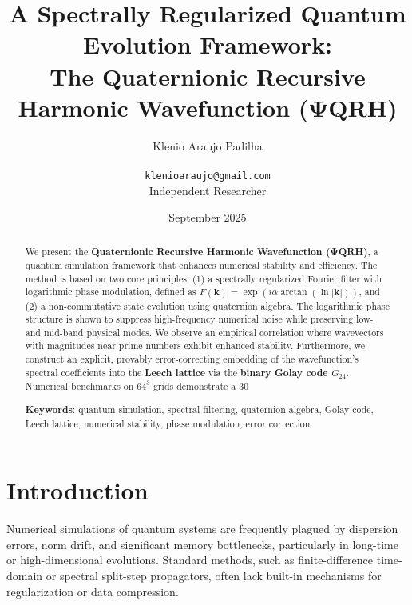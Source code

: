 \documentclass[12pt]{article}
\title{A Spectrally Regularized Quantum Evolution Framework: \\ The Quaternionic Recursive Harmonic Wavefunction (ΨQRH)}
\author{Klenio Araujo Padilha \\ \\ \texttt{klenioaraujo@gmail.com} \\ Independent Researcher}
\date{September 2025}
\begin{document}
\maketitle

\begin{abstract}
We present the \textbf{Quaternionic Recursive Harmonic Wavefunction (ΨQRH)}, a quantum simulation framework that enhances numerical stability and efficiency. The method is based on two core principles: (1) a spectrally regularized Fourier filter with logarithmic phase modulation, defined as $ F(\mathbf{k}) = \exp(i \alpha \arctan(\ln |\mathbf{k}|)) $, and (2) a non-commutative state evolution using quaternion algebra. The logarithmic phase structure is shown to suppress high-frequency numerical noise while preserving low- and mid-band physical modes. We observe an empirical correlation where wavevectors with magnitudes near prime numbers exhibit enhanced stability. Furthermore, we construct an explicit, provably error-correcting embedding of the wavefunction’s spectral coefficients into the \textbf{Leech lattice} via the \textbf{binary Golay code $ G_{24} $}. Numerical benchmarks on $64^3$ grids demonstrate a 30%

\textbf{Keywords}: quantum simulation, spectral filtering, quaternion algebra, Golay code, Leech lattice, numerical stability, phase modulation, error correction.
\end{abstract}

\section{Introduction}
Numerical simulations of quantum systems are frequently plagued by dispersion errors, norm drift, and significant memory bottlenecks, particularly in long-time or high-dimensional evolutions. Standard methods, such as finite-difference time-domain or spectral split-step propagators, often lack built-in mechanisms for regularization or data compression.
\end{document}
